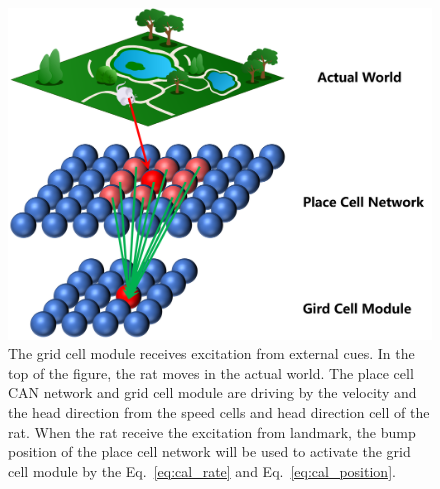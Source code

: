 \documentclass[final,5p,times,twocolumn,authoryear]{elsarticle}
\begin{document}
\begin{figure}[!t]
	\centering
	\includegraphics[width=0.8\linewidth]{Figure/w-p-g.png}
	\caption{The grid cell module receives excitation from external cues. In the top of the figure, the rat moves in the actual world. The place cell CAN network and grid cell module are driving by the velocity and the head direction from the speed cells and head direction cell of the rat. When the rat receive the excitation from landmark, the bump position of the place cell network will be used to activate the grid cell module by the Eq.~\eqref{eq:cal_rate} and Eq.~\eqref{eq:cal_position}.}
	\label{fig:w2p2g}
\end{figure}
\end{document}
